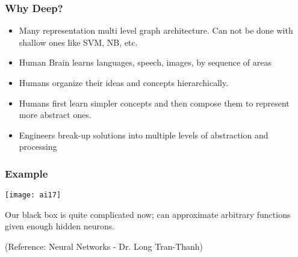 \begin{frame}[fragile] \frametitle{Why Deep?}

\begin{itemize}
\item Many representation multi level graph architecture. Can not be done with shallow ones like SVM, NB, etc.
\item Human Brain learns languages, speech, images, by sequence of areas
\item Humans organize their ideas and concepts hierarchically.
\item Humans first learn simpler concepts and then compose them to represent more abstract ones.
\item Engineers break-up solutions into multiple levels of abstraction and processing 
\end{itemize}
\end{frame}

\begin{frame}[fragile] \frametitle{Example}


\begin{center}
\texttt{[image: ai17]}
\end{center}

Our black box is quite complicated now; can approximate arbitrary functions given enough hidden neurons. 

\tiny{(Reference: Neural Networks - Dr. Long Tran-Thanh)}

\end{frame}




